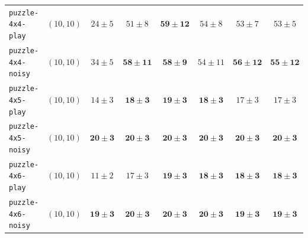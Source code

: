 \begin{tabular}{lccc|cccc}
\texttt{puzzle-4x4-play} & $(10,10)$ & $24 \pm 5$ & $51 \pm 8$ & $\mathbf{59 \pm 12}$ & $54 \pm 8$ & $53 \pm 7$ & $53 \pm 5$ \\
\texttt{puzzle-4x4-noisy} & $(10,10)$ & $34 \pm 5$ & $\mathbf{58 \pm 11}$ & $\mathbf{58 \pm 9}$ & $54 \pm 11$ & $\mathbf{56 \pm 12}$ & $\mathbf{55 \pm 12}$ \\
\texttt{puzzle-4x5-play} & $(10,10)$ & $14 \pm 3$ & $\mathbf{18 \pm 3}$ & $\mathbf{19 \pm 3}$ & $\mathbf{18 \pm 3}$ & $17 \pm 3$ & $17 \pm 3$ \\
\texttt{puzzle-4x5-noisy} & $(10,10)$ & $\mathbf{20 \pm 3}$ & $\mathbf{20 \pm 3}$ & $\mathbf{20 \pm 3}$ & $\mathbf{20 \pm 3}$ & $\mathbf{20 \pm 3}$ & $\mathbf{20 \pm 3}$ \\
\texttt{puzzle-4x6-play} & $(10,10)$ & $11 \pm 2$ & $17 \pm 3$ & $\mathbf{19 \pm 3}$ & $\mathbf{18 \pm 3}$ & $\mathbf{18 \pm 3}$ & $\mathbf{18 \pm 3}$ \\
\texttt{puzzle-4x6-noisy} & $(10,10)$ & $\mathbf{19 \pm 3}$ & $\mathbf{20 \pm 3}$ & $\mathbf{20 \pm 3}$ & $\mathbf{20 \pm 3}$ & $\mathbf{19 \pm 3}$ & $\mathbf{19 \pm 3}$ \\
\bottomrule
\end{tabular}
